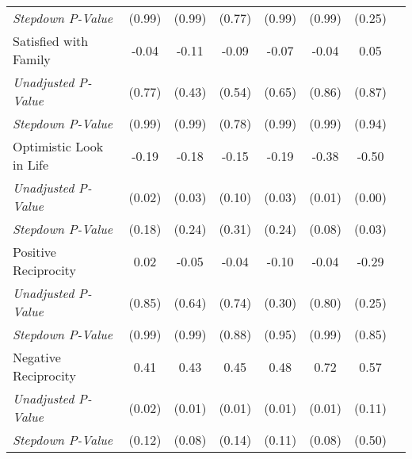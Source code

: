 \begin{tabular}{l c c c c c c c}
\quad \textit{Stepdown P-Value} & (0.99) & (0.99) & (0.77) & (0.99) & (0.99) & (0.25) \\
Satisfied with Family & -0.04 & -0.11 & -0.09 & -0.07 & -0.04 & 0.05 \\
\quad \textit{Unadjusted P-Value} & (0.77) & (0.43) & (0.54) & (0.65) & (0.86) & (0.87) \\
\quad \textit{Stepdown P-Value} & (0.99) & (0.99) & (0.78) & (0.99) & (0.99) & (0.94) \\
Optimistic Look in Life & -0.19 & -0.18 & -0.15 & -0.19 & -0.38 & -0.50 \\
\quad \textit{Unadjusted P-Value} & (0.02) & (0.03) & (0.10) & (0.03) & (0.01) & (0.00) \\
\quad \textit{Stepdown P-Value} & (0.18) & (0.24) & (0.31) & (0.24) & (0.08) & (0.03) \\
Positive Reciprocity & 0.02 & -0.05 & -0.04 & -0.10 & -0.04 & -0.29 \\
\quad \textit{Unadjusted P-Value} & (0.85) & (0.64) & (0.74) & (0.30) & (0.80) & (0.25) \\
\quad \textit{Stepdown P-Value} & (0.99) & (0.99) & (0.88) & (0.95) & (0.99) & (0.85) \\
Negative Reciprocity & 0.41 & 0.43 & 0.45 & 0.48 & 0.72 & 0.57 \\
\quad \textit{Unadjusted P-Value} & (0.02) & (0.01) & (0.01) & (0.01) & (0.01) & (0.11) \\
\quad \textit{Stepdown P-Value} & (0.12) & (0.08) & (0.14) & (0.11) & (0.08) & (0.50) \\
\bottomrule
\end{tabular}
